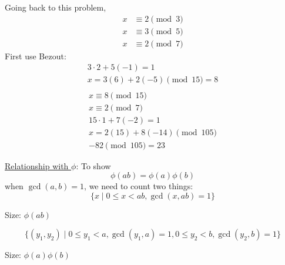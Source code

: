         \begin{example} 
            Going back to this problem, 
            \begin{align*}
                x &\equiv 2\pmod{3} \\
                x &\equiv 3\pmod{5} \\
                x &\equiv 2\pmod{7}
            \end{align*}
            First use Bezout:
            \begin{align*}
                3\cdot 2+5(-1)=1 \\
                x = 3(6)+2(-5)\pmod{15} = 8 \\
            \end{align*} 
            \begin{align*}
                x\equiv 8\pmod{15} \\
                x\equiv 2\pmod{7} \\
                15\cdot 1 + 7(-2) = 1 \\
                x = 2(15) + 8(-14)\pmod{105} \\
                -82\pmod{105} = 23
            \end{align*}
        \end{example}   

        \underline{Relationship with $\phi$}: To show
        \[ \phi(ab) = \phi(a)\phi(b) \]
        when $\gcd(a,b)=1$, we need to count two things: 
        \[ 
            \{ x\mid 0\le x<ab, \gcd(x,ab)=1 \} 
        \]
        \begin{center}Size: $\phi(ab)$\end{center}
        \[ 
            \{ (y_1,y_2)\mid 0\le y_1 < a, \gcd(y_1,a)=1,
            0\le y_2<b, \gcd(y_2,b)=1 \} 
        \]
        \begin{center}Size: $\phi(a)\phi(b)$\end{center}

